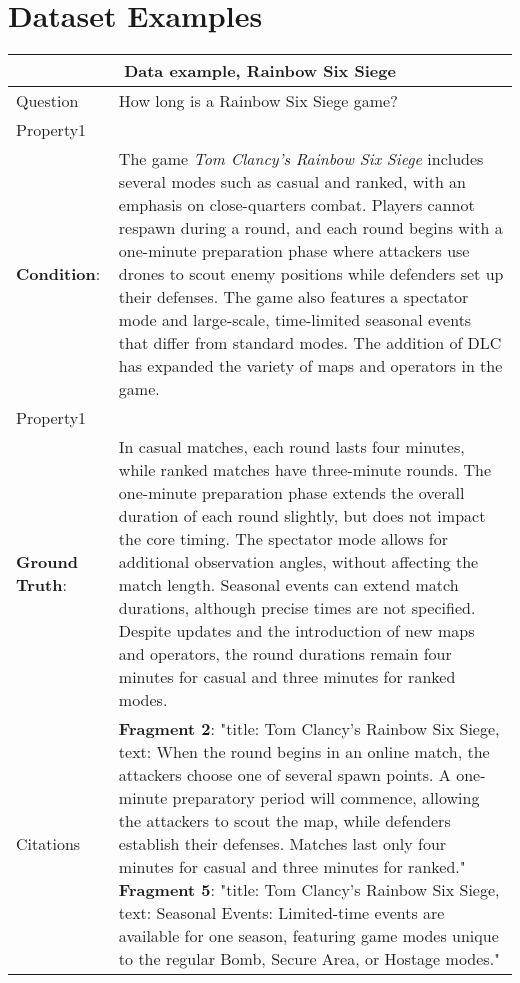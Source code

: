 

\renewcommand{\thesection}{\Alph{section}}  
\section{Dataset Examples}
\label{appendix_label}


\begin{table}[htbp]
\centering
\begin{tabular}{l p{}}
\hline
\multicolumn{2}{c}{Data example, Rainbow Six Siege} \\
\hline
Question & How long is a Rainbow Six Siege game? \\
\hline
Property1  & \\ \textbf{Condition}: & The game \textit{Tom Clancy's Rainbow Six Siege} includes several modes such as casual and ranked, with an emphasis on close-quarters combat. Players cannot respawn during a round, and each round begins with a one-minute preparation phase where attackers use drones to scout enemy positions while defenders set up their defenses. The game also features a spectator mode and large-scale, time-limited seasonal events that differ from standard modes. The addition of DLC has expanded the variety of maps and operators in the game. \\
\hline
Property1 & \\ \textbf{Ground Truth}:  &In casual matches, each round lasts four minutes, while ranked matches have three-minute rounds. The one-minute preparation phase extends the overall duration of each round slightly, but does not impact the core timing. The spectator mode allows for additional observation angles, without affecting the match length. Seasonal events can extend match durations, although precise times are not specified. Despite updates and the introduction of new maps and operators, the round durations remain four minutes for casual and three minutes for ranked modes. \\
\hline
Citations &\textbf{Fragment 2}: "title: Tom Clancy's Rainbow Six Siege, text: When the round begins in an online match, the attackers choose one of several spawn points. A one-minute preparatory period will commence, allowing the attackers to scout the map, while defenders establish their defenses. Matches last only four minutes for casual and three minutes for ranked." \newline\newline
\textbf{Fragment 5}: "title: Tom Clancy's Rainbow Six Siege, text: Seasonal Events: Limited-time events are available for one season, featuring game modes unique to the regular Bomb, Secure Area, or Hostage modes." \newline\newline

\end{tabular}
\end{table}
